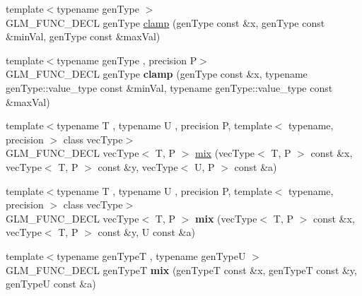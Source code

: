 \begin{DoxyCompactItemize}
\item 
{\footnotesize template$<$typename gen\-Type $>$ }\\G\-L\-M\-\_\-\-F\-U\-N\-C\-\_\-\-D\-E\-C\-L gen\-Type \hyperlink{group__core__func__common_ga72e9e213c84f06a329a2a838b51200f4}{clamp} (gen\-Type const \&x, gen\-Type const \&min\-Val, gen\-Type const \&max\-Val)
\item 
\hypertarget{group__core__func__common_ga5409c55a5f3aaae3e02ed440a47380bb}{{\footnotesize template$<$typename gen\-Type , precision P$>$ }\\G\-L\-M\-\_\-\-F\-U\-N\-C\-\_\-\-D\-E\-C\-L gen\-Type {\bfseries clamp} (gen\-Type const \&x, typename gen\-Type\-::value\-\_\-type const \&min\-Val, typename gen\-Type\-::value\-\_\-type const \&max\-Val)}\label{group__core__func__common_ga5409c55a5f3aaae3e02ed440a47380bb}

\item 
{\footnotesize template$<$typename T , typename U , precision P, template$<$ typename, precision $>$ class vec\-Type$>$ }\\G\-L\-M\-\_\-\-F\-U\-N\-C\-\_\-\-D\-E\-C\-L vec\-Type$<$ T, P $>$ \hyperlink{group__core__func__common_gadccbaffe46f369cf1a96b2aef92cbfdd}{mix} (vec\-Type$<$ T, P $>$ const \&x, vec\-Type$<$ T, P $>$ const \&y, vec\-Type$<$ U, P $>$ const \&a)
\item 
\hypertarget{group__core__func__common_gaa5c83ada94113757c0a555ab4f40cd6e}{{\footnotesize template$<$typename T , typename U , precision P, template$<$ typename, precision $>$ class vec\-Type$>$ }\\G\-L\-M\-\_\-\-F\-U\-N\-C\-\_\-\-D\-E\-C\-L vec\-Type$<$ T, P $>$ {\bfseries mix} (vec\-Type$<$ T, P $>$ const \&x, vec\-Type$<$ T, P $>$ const \&y, U const \&a)}\label{group__core__func__common_gaa5c83ada94113757c0a555ab4f40cd6e}

\item 
\hypertarget{group__core__func__common_ga78aae7eea618ca112053d59fe03db239}{{\footnotesize template$<$typename gen\-Type\-T , typename gen\-Type\-U $>$ }\\G\-L\-M\-\_\-\-F\-U\-N\-C\-\_\-\-D\-E\-C\-L gen\-Type\-T {\bfseries mix} (gen\-Type\-T const \&x, gen\-Type\-T const \&y, gen\-Type\-U const \&a)}\label{group__core__func__common_ga78aae7eea618ca112053d59fe03db239}


\end{DoxyCompactItemize}
